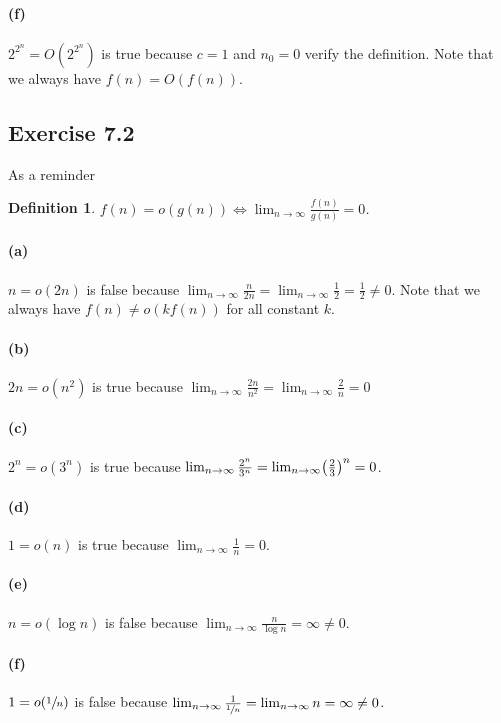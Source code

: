 \documentclass{article}
\newcommand{\definitionname}{Definition}
\newtheorem{definition}{\definitionname}
\begin{document}
\paragraph{(f)}
\(2^{2^n} = O(2^{2^n})\)
is true because \(c = 1\) and \(n_0 = 0\) verify the definition. Note that we
always have \(f(n) = O(f(n))\).

\subsection{Exercise 7.2}
As a reminder
\begin{definition}
	\(f(n) = o(g(n)) \iff \lim_{n \to \infty} \frac{f(n)}{g(n)} = 0\).
\end{definition}

\paragraph{(a)}
\(n = o(2n)\) is false because \(\lim_{n \to \infty} \frac{n}{2n} = \lim_{n \to
\infty} \frac{1}{2} = \frac{1}{2} \neq 0\). Note that we always have \(f(n)
\neq o(k f(n))\) for all constant \(k\).

\paragraph{(b)}
\(2n = o(n^2)\) is true because \(\lim_{n \to \infty} \frac{2n}{n^2} =
\lim_{n \to \infty} \frac{2}{n} = 0\)

\paragraph{(c)}
\(2^n = o(3^n)\) is true because \(\lim_{n \to \infty} \frac{2^n}{3^n} =
\lim_{n \to \infty} \mleft(\frac{2}{3}\mright)^n = 0\).

\paragraph{(d)}
\(1 = o(n)\) is true because \(\lim_{n \to \infty} \frac{1}{n} = 0\).

\paragraph{(e)}
\(n = o(\log n)\) is false because \(\lim_{n \to \infty} \frac{n}{\log n} =
\infty \neq 0\).

\paragraph{(f)}
\(1 = o(\sfrac{1}{n})\) is false because \(\lim_{n \to \infty}
\frac{1}{\sfrac{1}{n}} = \lim_{n \to \infty} n = \infty \neq 0\).
\end{document}
